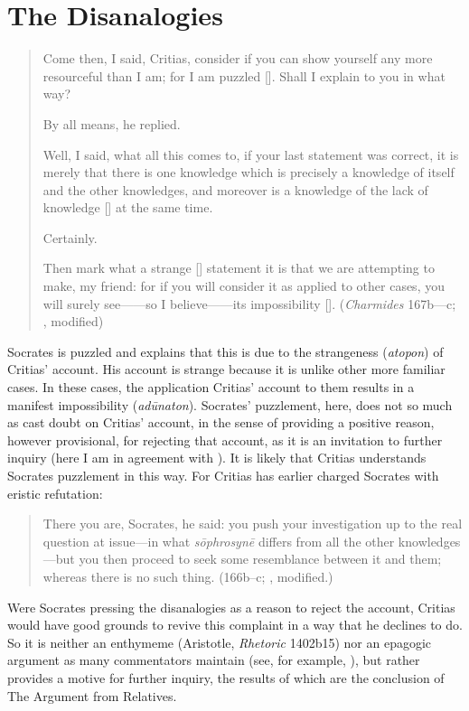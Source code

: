 
\section{The Disanalogies} %
\label{sec:the_disanalogies}

\begin{quotation}
	Come then, I said, Critias, consider if you can show yourself any more resourceful than I am; for I am puzzled []. Shall I explain to you in what way?
	
	By all means, he replied.
	
	Well, I said, what all this comes to, if your last statement was correct, it is merely that there is one knowledge which is precisely a knowledge of itself and the other knowledges, and moreover is a knowledge of the lack of knowledge [] at the same time.
	
	Certainly.
	
	Then mark what a strange [] statement it is that we are attempting to make, my friend: for if you will consider it as applied to other cases, you will surely see——so I believe——its impossibility []. (\emph{Charmides} 167b—c; \citealt[57]{Lamb:1927qw}, modified)
\end{quotation}

Socrates is puzzled and explains that this is due to the strangeness (\emph{atopon}) of  Critias' account. His account is strange because it is unlike other more familiar cases. In these cases, the application Critias' account to them results in a manifest impossibility (\emph{adūnaton}). Socrates' puzzlement, here, does not so much as cast doubt on Critias' account, in the sense of providing a positive reason, however provisional, for rejecting that account, as it is an invitation to further inquiry (here I am in agreement with \citealt{Politis:2008nv}). It is likely that Critias understands Socrates puzzlement in this way. For Critias has earlier charged Socrates with eristic refutation:
\begin{quote}
	There you are, Socrates, he said: you push your investigation up to the real question at issue—in what \emph{sōphrosynē} differs from all the other knowledges—but you then proceed to seek some resemblance between it and them; whereas there is no such thing. (166b–c; \citealt[53]{Lamb:1927qw}, modified.)
\end{quote}	
Were Socrates pressing the disanalogies as a reason to reject the account, Critias would have good grounds to revive this complaint in a way that he declines to do. So it is neither an enthymeme (Aristotle, \emph{Rhetoric} 1402b15) nor an epagogic argument as many commentators maintain (see, for example, \citealt[41]{Robinson:1941yb}), but rather provides a motive for further inquiry, the results of which are the conclusion of The Argument from Relatives.

